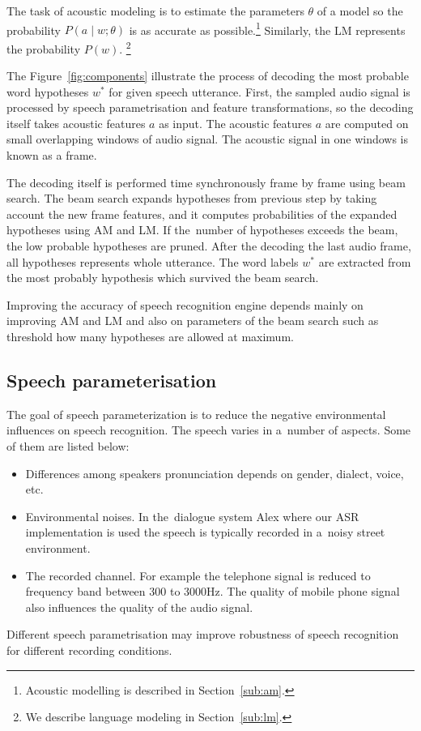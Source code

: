 The task of acoustic modeling is to estimate the parameters $\theta$ of a model so the probability $P(a \mid w ; \theta)$ is as accurate as possible.\footnote{Acoustic modelling is described in Section~\ref{sub:am}.} 
Similarly, the \ac{LM} represents the probability $P(w)$. \footnote{We describe language modeling in Section~\ref{sub:lm}.}

The Figure~\ref{fig:components} illustrate the process of decoding the most probable word hypotheses $w^*$ for given speech utterance. 
First, the sampled audio signal is processed by speech parametrisation and feature transformations, so the decoding itself takes acoustic features $a$ as input. The acoustic features $a$ are computed on small overlapping windows of audio signal.
The acoustic signal in one windows is known as a frame.

The decoding itself is performed time synchronously frame by frame using beam search.
The beam search expands hypotheses from previous step by taking account the new frame features, and it computes probabilities of the expanded hypotheses using \ac{AM} and \ac{LM}.
If the~number of hypotheses exceeds the beam, the low probable hypotheses are pruned.
After the decoding the last audio frame, all hypotheses represents whole utterance.
The word labels $w^*$ are extracted from the most probably hypothesis which survived the beam search.

Improving the accuracy of speech recognition engine depends mainly on improving \ac{AM} and \ac{LM}
and also on parameters of the beam search such as threshold how many hypotheses are allowed at maximum.


\subsection{Speech parameterisation}
\label{sub:param}
The goal of speech parameterization is to reduce the negative environmental influences on speech recognition.
The speech varies in a~number of aspects. Some of them are listed below:
\begin{itemize}
    \item Differences among speakers pronunciation depends on gender, dialect, voice, etc.
    \item Environmental noises. In the~dialogue system Alex where our \ac{ASR} implementation is used the speech is typically recorded in a~noisy street environment.
    \item The recorded channel.
        For example the telephone signal is reduced to frequency band between 300 to 3000Hz.
        The quality of mobile phone signal also influences the quality of the audio signal.
\end{itemize}
Different speech parametrisation may improve robustness of speech recognition for different recording conditions.

